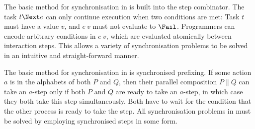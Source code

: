 The basic method for synchronisation in \TOP is built into the step combinator.
The task $t \Next e$ can only continue execution when two conditions are met:
Task $t$ must have a value $v$, and $e\ v$ must not evaluate to $\Fail$.
Programmers can encode arbitrary conditions in $e\ v$, which are evaluated atomically between interaction steps.
This allows a variety of synchronisation problems to be solved in an intuitive and straight-forward manner.

The basic method for synchronisation in \CSP is synchronised prefixing.
If some action $a$ is in the alphabets of both $P$ and $Q$, then their parallel composition $P \parallel Q$ can take an $a$-step only if both $P$ and $Q$ are ready to take an $a$-step, in which case they both take this step simultaneously.
Both have to wait for the condition that the other process is ready to take the step.
All synchronisation problems in \CSP must be solved by employing synchronised steps in some form.



